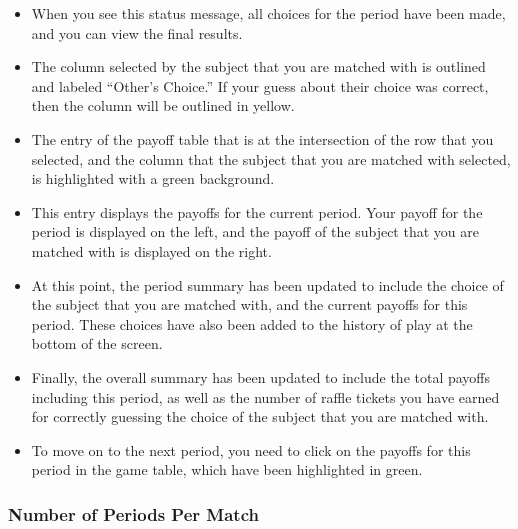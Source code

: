 \documentclass[11pt]{article}
\newcommand{\dblbkt}[1]{\ignorespaces}
\begin{document}
\begin{itemize}
\begin{itemize} 
\item When you see this status message, all choices for the period have been made, and you can view the final results.  
\item \dblbkt{1} The column selected by the subject that you are matched with is outlined and labeled ``Other's Choice.''  If your guess about their choice was correct, then the column will be outlined in yellow.
\item \dblbkt{1} The entry of the payoff table that is at the intersection of the row that you selected, and the column that the subject that you are matched with selected, is highlighted with a green background.   
\item This entry displays the payoffs for the current period.  Your payoff for the period is displayed on the left, and the payoff of the subject that you are matched with is displayed on the right.  
\item At this point, the period summary has been updated to include \dblbkt{1} the choice of the subject that you are matched with, \dblbkt{1} and the current payoffs for this period.  These choices have also been added to the \dblbkt{1} history of play at the bottom of the screen.  
\item  Finally, \dblbkt{1} the overall summary has been updated to include \dblbkt{1} the total payoffs including this period, as well as \dblbkt{1} the number of raffle tickets you have earned for correctly guessing the choice of the subject that you are matched with.
\item \dblbkt{1} To move on to the next period, you need to click on the payoffs for this period in the game table, which have been highlighted in  \dblbkt{1} green. \dblbkt{slnc 3000} 
\end{itemize} 
\end{itemize}

\subsubsection*{\dblbkt{4}Number of Periods Per Match} 
\end{document}
